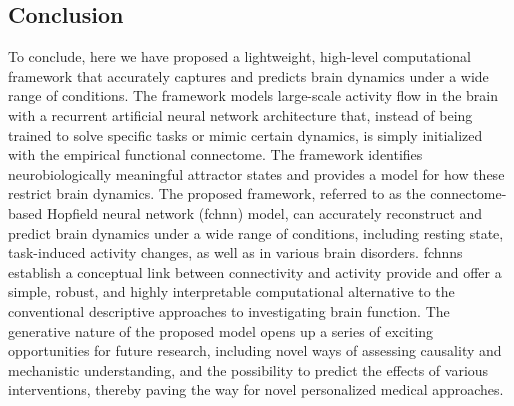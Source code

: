 \documentclass{article}
\begin{document}

\subsection{Conclusion}

To conclude, here we have proposed a lightweight, high-level computational framework that accurately captures and predicts brain dynamics under a wide range of conditions. The framework models large-scale activity flow in the brain with a recurrent artificial neural network architecture that, instead of being trained to solve specific tasks or mimic certain dynamics, is simply initialized with the empirical functional connectome. The framework identifies neurobiologically meaningful attractor states and provides a model for how these restrict brain dynamics. The proposed framework, referred to as the connectome-based Hopfield neural network (\acrshort{fchnn}) model, can accurately reconstruct and predict brain dynamics under a wide range of conditions, including resting state, task-induced activity changes, as well as in various brain disorders. \acrshort{fchnn}s establish a conceptual link between connectivity and activity provide and offer a simple, robust, and highly interpretable computational alternative to the conventional descriptive approaches to investigating brain function. The generative nature of the proposed model opens up a series of exciting opportunities for future research, including novel ways of assessing causality and mechanistic understanding, and the possibility to predict the effects of various interventions, thereby paving the way for novel personalized medical approaches.
\end{document}
